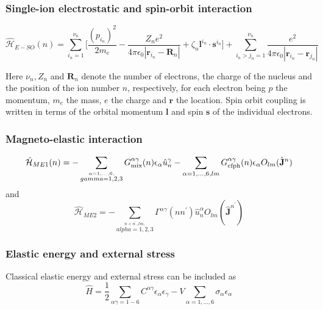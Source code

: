 \documentclass[twoside]{article}
\newcommand{\text}[1]{{\rm #1}}
\begin{document}
{\subsubsection{Single-ion electrostatic and spin-orbit interaction}

\begin{equation}
    \hat{\mathcal{H}}_{E-SO}(n)
    =
    \sum_{i_n=1}^{\nu_n}
    \Biggl[
        \frac{(p_{i_n})^2}{2m_e}
        -
        \frac{Z_n e^2}{4\pi \epsilon_0 |\mathbf{r}_{i_n} - \mathbf{R}_n|}
        +
        \zeta_n
        \mathbf{l}^{i_n}
        \cdot
        \mathbf{s}^{i_n}
    \Biggr]
    +
    \sum_{i_n > j_n=1}^{\nu_n}
    \frac{e^2}{4\pi \epsilon_0 |\mathbf{r}_{i_n} - \mathbf{r}_{j_n}|}
\end{equation}

Here $\nu_n,Z_n$ and $\mathbf{R}_n$ denote the number of electrons,
the charge of the nucleus and the position of the ion number $n$,
respectively, for each electron being $p$ the momentum, $m_e$
the mass, $e$ the charge and $\mathbf{r}$ the location. Spin orbit
coupling is written in terms of the orbital momentum $\mathbf{l}$ and spin
$\mathbf{s}$ of the individual electrons. 

\subsubsection{Magneto-elastic interaction}

\begin{equation}
    \hat{\mathcal{H}}_{ME1}(n)
    =
    -
    \sum_{\stackrel{\alpha=1,\dots,6,}{gamma=1,2,3}}
    G^{\alpha\gamma}_{\text{mix}}(n)
    \epsilon_{\alpha}
    \hat{u}_n^{\gamma}
    -
    \sum_{\alpha=1,\dots,6, lm}
    G^{\alpha\gamma}_{\text{cfph}}(n)
    \epsilon_{\alpha}
    O_{lm}(\hat{\mathbf{J}}^n)
\end{equation}
and 
\begin{equation}
    \hat{\mathcal{H}}_{ME2}
    =
    -
    \sum_{\stackrel{n<n^{\prime},lm,}{alpha=1,2,3}}
    \Gamma^{\alpha\gamma}(nn^{\prime})
    \hat{u}_n^{\alpha}
    O_{lm}(\hat{\mathbf{J}}^{n^{\prime}})
\end{equation}

\subsubsection{Elastic energy and external stress}

Classical elastic energy and external stress can be included as
\begin{equation}
    \hat{H}
    =
    \frac{1}{2}
    \sum_{\alpha\gamma=1-6}
    C^{\alpha\gamma}
    \epsilon_{\alpha}
    \epsilon_{\gamma}
    - V
    \sum_{\alpha=1,\dots,6}
    \sigma_{\alpha}
    \epsilon_{\alpha}
\end{equation}
}
\clearpage
\end{document}
